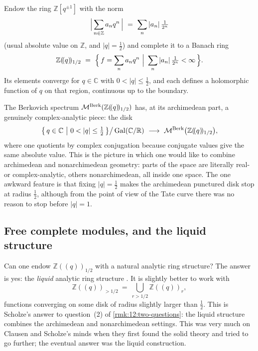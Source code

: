 \begin{definition}
\label{def:12:Zq-half}
Endow the ring $\mathbb{Z}[q^{\pm1}]$ with the norm
\begin{equation*}
\Bigl|\,\sum_{n\in\mathbb{Z}} a_n q^{n}\,\Bigr|\ =\ \sum_{n}|a_n|\,\tfrac{1}{2^{n}}
\end{equation*}
(usual absolute value on $\mathbb{Z}$, and $|q|=\tfrac12$) and complete it to a
Banach ring
\begin{equation*}
\mathbb{Z}(\!(q)\!)_{1/2}\ =\ \Bigl\{\,f=\sum_n a_n q^{n}\ \Big|\
\sum_n |a_n|\,\tfrac{1}{2^{n}}<\infty\,\Bigr\}.
\end{equation*}
Its elements converge for $q\in\mathbb{C}$ with $0<|q|\le\tfrac12$, and each
defines a holomorphic function of $q$ on that region, continuous up to the
boundary.
\end{definition}

The Berkovich spectrum $\mathcal{M}^{\mathrm{Berk}}(\mathbb{Z}(\!(q)\!)_{1/2})$ has, at its
archimedean part, a genuinely complex-analytic piece: the disk
\begin{equation*}
\bigl\{\,q\in\mathbb{C}\ \big|\ 0<|q|\le\tfrac12\,\bigr\}\big/\Gal(\mathbb{C}/\mathbb{R})
\ \longrightarrow\ \MBerk\bigl(\mathbb{Z}(\!(q)\!)_{1/2}\bigr),
\end{equation*}
where one quotients by complex conjugation because conjugate values give the
same absolute value. This is the picture in which one would like to combine
archimedean and nonarchimedean geometry: parts of the space are literally
real- or complex-analytic, others nonarchimedean, all inside one space. The one
awkward feature is that fixing $|q|=\tfrac12$ makes the archimedean punctured
disk stop at radius $\tfrac12$, although from the point of view of the Tate curve
there was no reason to stop before $|q|=1$.

\subsection{Free complete modules, and the liquid structure}

\begin{remark}
\label{rmk:12:liquid-question}
Can one endow $\mathbb{Z}(\!(q)\!)_{1/2}$ with a natural analytic ring structure?
The answer is yes: the \emph{liquid} analytic ring structure
\cite{scholze2020analytic}. It is slightly better to work with
\begin{equation*}
\mathbb{Z}(\!(q)\!)_{>1/2}\ =\ \bigcup_{r>1/2}\mathbb{Z}(\!(q)\!)_{r},
\end{equation*}
functions converging on some disk of radius slightly larger than $\tfrac12$.
This is Scholze's answer to question~(2) of \cref{rmk:12:two-questions}: the
liquid structure combines the archimedean and nonarchimedean settings. This was
very much on Clausen and Scholze's minds when they first found the solid theory
and tried to go further; the eventual answer was the liquid construction.
\end{remark}

